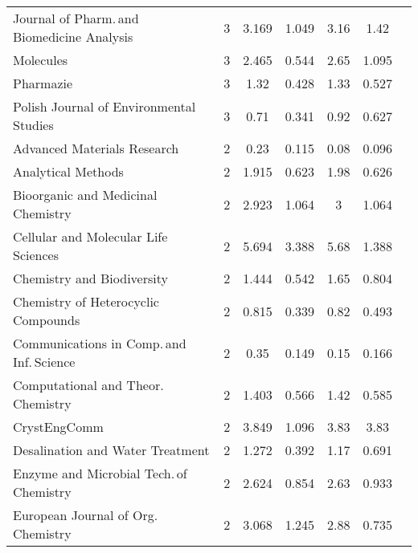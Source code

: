 {\begin{longtable}[c]{lcccccc}
  Journal of Pharm.\,and Biomedicine Analysis              & 3  & 3.169         & 1.049          & 3.16 & 1.42          \\
  Molecules                                                & 3  & 2.465         & 0.544          & 2.65 & 1.095         \\
  Pharmazie                                                & 3  & 1.32          & 0.428          & 1.33 & 0.527         \\[1ex]
  Polish Journal of Environmental Studies                  & 3  & 0.71          & 0.341          & 0.92 & 0.627         \\
  Advanced Materials Research                              & 2  & 0.23          & 0.115          & 0.08 & 0.096         \\
  Analytical Methods                                       & 2  & 1.915         & 0.623          & 1.98 & 0.626         \\
  Bioorganic and Medicinal Chemistry                       & 2  & 2.923         & 1.064          & 3    & 1.064         \\
  Cellular and Molecular Life Sciences                     & 2  & 5.694         & 3.388          & 5.68 & 1.388         \\[1ex]
  Chemistry and Biodiversity                               & 2  & 1.444         & 0.542          & 1.65 & 0.804         \\
  Chemistry of Heterocyclic Compounds                      & 2  & 0.815         & 0.339          & 0.82 & 0.493         \\
  Communications in Comp.\,and Inf.\,Science               & 2  & 0.35          & 0.149          & 0.15 & 0.166         \\
  Computational and Theor.\,Chemistry                      & 2  & 1.403         & 0.566          & 1.42 & 0.585         \\
  CrystEngComm                                             & 2  & 3.849         & 1.096          & 3.83 & 3.83          \\[1ex]
  Desalination and Water Treatment                         & 2  & 1.272         & 0.392          & 1.17 & 0.691         \\
  Enzyme and Microbial Tech.\,of Chemistry                 & 2  & 2.624         & 0.854          & 2.63 & 0.933         \\
  European Journal of Org.\,Chemistry                      & 2  & 3.068         & 1.245          & 2.88 & 0.735         \\

\end{longtable}}
